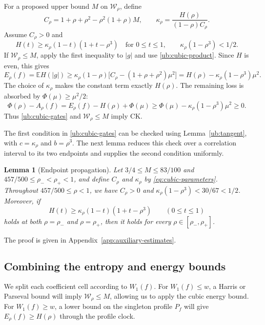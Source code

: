\documentclass[11pt,letterpaper]{amsart}
\newcommand{\E}{\mathbb E}
\newcommand{\1}{\mathbf 1}
\newtheorem{lemma}[theorem]{Lemma}
\numberwithin{equation}{section}
\begin{document}
For a proposed upper bound $M$ on $\mathcal W_\rho$, define
\begin{equation}\label{eq:cubic-parameters}
 C_\rho=1+\rho+\rho^2-\rho^2(1+\rho)M,
 \qquad
 \kappa_\rho=\frac{H(\rho)}{(1-\rho)C_\rho}.
\end{equation}
Assume $C_\rho>0$ and
\begin{equation}\label{ub:cubic-gates}
 H(t)\ge\kappa_\rho(1-t)(1+t-\rho^3)
 \quad \text{for } 0\le t\le1, \qquad
 \kappa_\rho(1-\rho^3)<1/2.
\end{equation}
If $\mathcal W_\rho\le M$, apply the first inequality to $|g|$
and use \eqref{ub:cubic-product}. Since $H$ is even, this gives
\[
 E_\rho(f)=\E H(|g|)\ge\kappa_\rho(1-\rho)
       \bigl[C_\rho-(1+\rho+\rho^2)\mu^2\bigr]=H(\rho)-\kappa_\rho(1-\rho^3)\mu^2.
\]
The choice of $\kappa_\rho$ makes the constant term exactly
$H(\rho)$. The remaining loss is absorbed by
$\Phi(\mu)\ge\mu^2/2$:
\begin{equation}\label{ub:cubic-bias}
 \Phi(\rho)-A_\rho(f)
 =E_\rho(f)-H(\rho)+\Phi(\mu)\ge\Phi(\mu)-\kappa_\rho(1-\rho^3)\mu^2
 \ge0.
\end{equation}
Thus \eqref{ub:cubic-gates} and $\mathcal W_\rho\le M$
imply CK.

The first condition in \eqref{ub:cubic-gates} can be checked
using Lemma~\ref{ub:tangent}, with $c=\kappa_\rho$ and $b=\rho^3$.
The next lemma reduces this check over a correlation interval
to its two endpoints and supplies the second condition uniformly.

\begin{lemma}[Endpoint propagation]\label{ub:cubic-endpoints}
Let $3/4\le M\le83/100$ and
$457/500\le\rho_-<\rho_+<1$, and define $C_\rho$ and
$\kappa_\rho$ by \eqref{eq:cubic-parameters}.
Throughout $457/500\le\rho<1$, we have
$C_\rho>0$ and
$\kappa_\rho(1-\rho^3)<30/67<1/2$.
Moreover, if
\[
 H(t)\ge\kappa_\rho(1-t)(1+t-\rho^3)
 \qquad(0\le t\le1)
\]
holds at both $\rho=\rho_-$ and $\rho=\rho_+$,
then it holds for every $\rho\in[\rho_-,\rho_+]$.
\end{lemma}

The proof is given in Appendix~\ref{app:auxiliary-estimates}.

\subsection{Combining the entropy and energy bounds}

We split each coefficient cell according to $W_1(f)$.
For $W_1(f)\le w$, a Harris or Parseval bound will imply
$\mathcal W_\rho\le M$, allowing us to apply the cubic energy bound.
For $W_1(f)\ge w$, a lower bound on the singleton profile $P_f$
will give $E_\rho(f)\ge H(\rho)$ through the profile clock.
\end{document}
